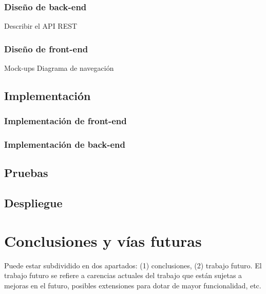 \documentclass[12pt]{article}
\begin{document}
\subsubsection{Diseño de back-end}
Describir el API REST
\subsubsection{Diseño de front-end}
Mock-ups
Diagrama de navegación

\subsection{Implementación}

\subsubsection{Implementación de front-end}
\subsubsection{Implementación de back-end}

\subsection{Pruebas}
\subsection{Despliegue}


\section{Conclusiones y vías futuras}
Puede estar subdividido en dos apartados: (1) conclusiones, (2) trabajo futuro. El trabajo futuro se refiere a carencias actuales del trabajo que están sujetas a mejoras en el futuro, posibles extensiones para dotar de mayor funcionalidad, etc.
\end{document}
